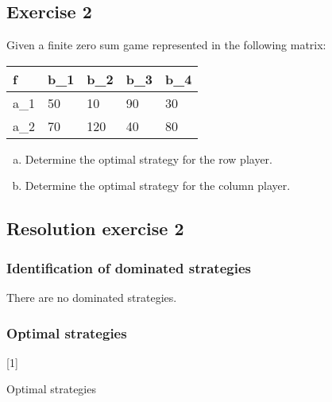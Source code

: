 \documentclass[\main/main.tex]{subfiles}
\begin{document}
\subsection{Exercise 2}
Given a finite zero sum game represented in the following matrix:

\begin{table}
  \begin{tabular}{L|LLLL}
    f   & b_1 & b_2 & b_3 & b_4 \\
    \hline
    a_1 & 50  & 10  & 90  & 30  \\
    a_2 & 70  & 120 & 40  & 80
  \end{tabular}
\end{table}

\begin{enumerate}[a)]
  \item Determine the optimal strategy for the row player.
  \item Determine the optimal strategy for the column player.
\end{enumerate}

\subsection{Resolution exercise 2}
\subsubsection*{Identification of dominated strategies}
There are no dominated strategies.

\subsubsection*{Optimal strategies}
[1]{\caption{Optimal strategies}}
\end{document}
